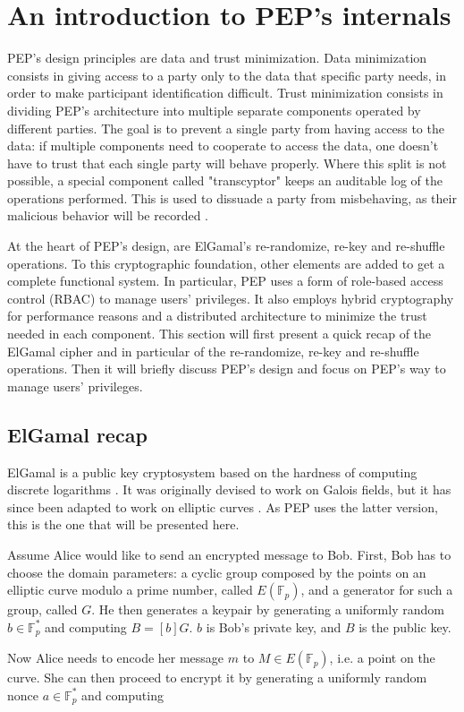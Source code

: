 \documentclass{report}
\begin{document}
\section{An introduction to PEP's internals}
PEP's design principles are data and trust minimization. Data minimization consists in giving access to a party only to the data that specific party needs, in order to make
participant identification difficult. Trust minimization consists in dividing PEP's architecture into multiple separate components operated by different parties. The goal is to
prevent a single party from having access to the data: if multiple components need to cooperate to access the data, one doesn't have to trust that each single party will
behave properly. Where this split is not possible, a special component called "transcyptor" keeps an auditable log of the operations performed. This is used to dissuade a party
from misbehaving, as their malicious behavior will be recorded \cite{pep-blueprint}. \par
At the heart of PEP's design, are ElGamal's re-randomize, re-key and re-shuffle operations. To this cryptographic foundation, other elements are added to get a complete functional system. In
particular, PEP uses a form of role-based access control (RBAC) \cite{rbac} to manage users' privileges. It also employs hybrid cryptography for performance reasons and a
distributed architecture to minimize the trust needed in each component. This section will first present a quick recap of the ElGamal cipher and in particular of the re-randomize, re-key and re-shuffle
operations. Then it will briefly discuss PEP's design and focus on PEP's way to manage users' privileges.

\subsection{ElGamal recap}
ElGamal is a public key cryptosystem based on the hardness of computing discrete logarithms \cite{elgamal}. It was originally devised to work on Galois fields, but it has since
been adapted to work on elliptic curves \cite{elliptic-elgamal}. As PEP uses the latter version, this is the one that will be presented here.\par
Assume Alice would like to send an encrypted message to Bob. First, Bob has to choose the domain parameters: a cyclic group composed by the points on an elliptic curve modulo a
prime number, called $E(\mathds{F}_p)$, and a generator for such a group, called $G$. He then generates a keypair by generating a uniformly random $b \in \mathds{F}^*_p$ and computing
$B=[b]G$. $b$ is Bob's private key, and $B$ is the public key.\par
Now Alice needs to encode her message $m$ to $M \in E(\mathds{F}_p)$, i.e. a point on the curve. She can then proceed to encrypt it by generating a uniformly random nonce $a \in
\mathds{F}^*_p$ and computing
\end{document}
